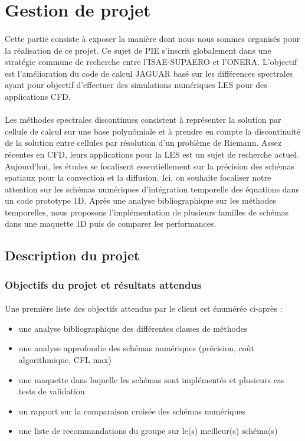 \section{Gestion de projet}

\paragraph{}
Cette partie consiste à exposer la manière dont nous nous sommes organisés pour la réalisation de ce projet. Ce sujet de PIE s'inscrit globalement dans une stratégie commune de recherche entre l'ISAE-SUPAERO et l'ONERA. L'objectif est l'amélioration du code de calcul JAGUAR basé sur les différences spectrales ayant pour objectif d'effectuer des simulations numériques LES pour des applications CFD.

\paragraph{}
Les méthodes spectrales discontinues consistent à représenter la solution par cellule de calcul sur une base polynômiale et à prendre en compte la discontinuité de la solution entre cellules par résolution d'un problème de Riemann. Assez récentes en CFD, leurs applications pour la LES est un sujet de recherche actuel. Aujourd'hui, les études se focalisent essentiellement sur la précision des schémas spatiaux pour la convection et la diffusion. Ici, on souhaite focaliser notre attention sur les schémas numériques d'intégration temporelle des équations dans un code prototype 1D. Après une analyse bibliographique sur les méthodes temporelles, nous proposons l'implémentation de plusieurs familles de schémas dans une maquette 1D puis de comparer les performances.

\subsection{Description du projet}

    \subsubsection{Objectifs du projet et résultats attendus}
        \paragraph{}
        Une première liste des objectifs attendus par le client est énumérée ci-après :
        \begin{itemize}
            \item une analyse bibliographique des différentes classes de méthodes
            \item une analyse approfondie des schémas numériques (précision, coût algorithmique, CFL max) 
            \item une maquette dans laquelle les schémas sont implémentés et plusieurs cas tests de validation 
            \item un rapport sur la comparaison croisée des schémas numériques
            \item une liste de recommandations du groupe sur le(s) meilleur(s) schéma(s)
        \end{itemize}

